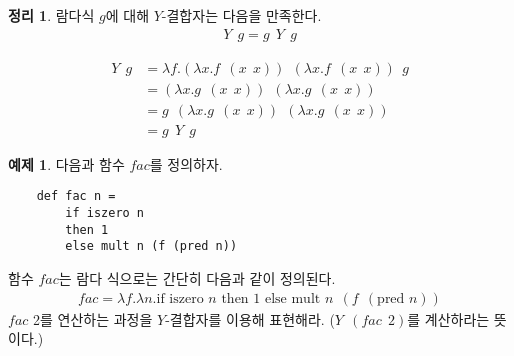 \documentclass[b5paper, 11pt]{book}
\theoremstyle{definition}
\newtheorem{thm}[defn]{정리}
\newtheorem{ex}[defn]{예제}
\newenvironment{pf*}{\pushQED{\qed}\pf}
{\popQED\endpf}
\begin{document}
\begin{thm}
    람다식 $g$에 대해 $Y$-결합자는 다음을 만족한다.
    \begin{align*}
        Y \;\, g = g \;\, Y \;\, g
    \end{align*}
\end{thm}
\begin{pf*}
    \begin{align*}
        Y \;\, g &= \lambda f.(\lambda x. f \;\, (x\;\, x)) \;\, (\lambda x. f \;\, (x \;\, x)) \;\, g \\
        &= (\lambda x. g \;\, (x \;\, x)) \;\, (\lambda x .g \;\, (x \;\, x)) \\ 
        &= g \;\,  (\lambda x. g \;\, (x \;\, x)) \;\, (\lambda x .g \;\, (x \;\, x))  \\ 
        &= g \;\, Y \;\, g
    \end{align*}
\end{pf*}
\begin{ex}
    다음과 함수 $fac$를 정의하자.
    \begin{lstlisting}
    def fac n =
        if iszero n 
        then 1 
        else mult n (f (pred n))
    \end{lstlisting}
    함수 $fac$는 람다 식으로는 간단히 다음과 같이 정의된다.
    \begin{align*}
        fac = \lambda f. \lambda n. \text{if } \text{iszero } n \text{ then }
        1 \text{ else } \text{mult } n \;\, (f \;\, (\text{pred } n))
    \end{align*}
    $fac$ 2를 연산하는 과정을 $Y$-결합자를 이용해 표현해라. ($Y \;\, (fac \;\, 2)$를 계산하라는 뜻이다.)
\end{ex}
\end{document}
